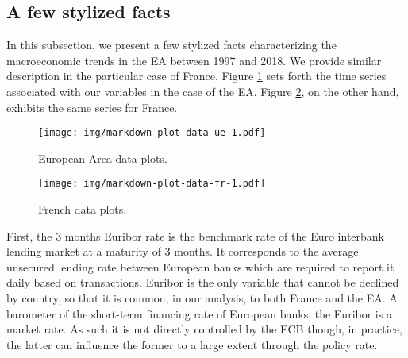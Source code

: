 \documentclass[
  11pt,
]{article}
\begin{document}
\hypertarget{a-few-stylized-facts}{%
\subsection{A few stylized facts}\label{a-few-stylized-facts}}

In this subsection, we present a few stylized facts characterizing the macroeconomic trends in the EA between 1997 and 2018.
We provide similar description in the particular case of France.
Figure \ref{fig:plot-data-ue} sets forth the time series associated with our variables in the case of the EA.
Figure \ref{fig:plot-data-fr}, on the other hand, exhibits the same series for France.

\begin{figure}
\centering
\texttt{[image: img/markdown-plot-data-ue-1.pdf]}
\caption{\label{fig:plot-data-ue}European Area data plots.}
\end{figure}

\begin{figure}
\centering
\texttt{[image: img/markdown-plot-data-fr-1.pdf]}
\caption{\label{fig:plot-data-fr}French data plots.}
\end{figure}

First, the 3 months Euribor rate is the benchmark rate of the Euro interbank lending market at a maturity of 3 months.
It corresponds to the average unsecured lending rate between European banks which are required to report it daily based on transactions.
Euribor is the only variable that cannot be declined by country, so that it is common, in our analysis, to both France and the EA.
A barometer of the short-term financing rate of European banks, the Euribor is a market rate.
As such it is not directly controlled by the ECB though, in practice, the latter can influence the former to a large extent through the policy rate.
\end{document}
